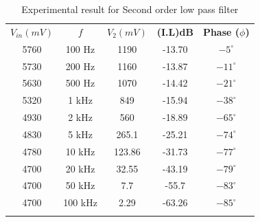 \documentclass[a4paper, 12pt, english]{article}
\newcommand{\myrowcolour}{\rowcolor[gray]{0.925}}
\begin{document}
\begin{table}[!ht]
	\caption{\label{tab:Table 1} Experimental result for Second order low pass filter}
	\centering
	\begin{tabular}{c c c c c}
		\toprule
		\textbf{$ V_{in} (mV)$}
		     & \textbf{$ f $}
		     & \textbf{$V_{2} (mV)$}
		     & \textbf{(I.L)dB}
		     & \textbf{Phase ($\phi $)}                                   \\
		\cmidrule[0.4pt](r{0.125em}){1-1}%
		\cmidrule[0.4pt](lr{0.125em}){2-2}%
		\cmidrule[0.4pt](lr{0.125em}){3-3}%
		\cmidrule[0.4pt](lr{0.125em}){4-4}%
		\cmidrule[0.4pt](lr{0.125em}){5-5}%
		5760 & 100 Hz                   & 1190   & -13.70 & $-5^{\circ}$  \\
		\myrowcolour%
		5730 & 200 Hz                   & 1160   & -13.87 & $-11^{\circ}$ \\
		5630 & 500 Hz                   & 1070   & -14.42 & $-21^{\circ}$ \\
		\myrowcolour%
		5320 & 1 kHz                    & 849    & -15.94 & $-38^{\circ}$ \\
		4930 & 2 kHz                    & 560    & -18.89 & $-65^{\circ}$ \\
		\myrowcolour%
		4830 & 5 kHz                    & 265.1  & -25.21 & $-74^{\circ}$ \\
		4780 & 10 kHz                   & 123.86 & -31.73 & $-77^{\circ}$ \\
		\myrowcolour%
		4700 & 20 kHz                   & 32.55  & -43.19 & $-79^{\circ}$ \\
		4700 & 50 kHz                   & 7.7    & -55.7  & $-83^{\circ}$ \\
		\myrowcolour%
		4700 & 100 kHz                  & 2.29   & -63.26 & $-85^{\circ}$ \\
		\bottomrule                                                       \\
	\end{tabular}
\end{table}
\end{document}
